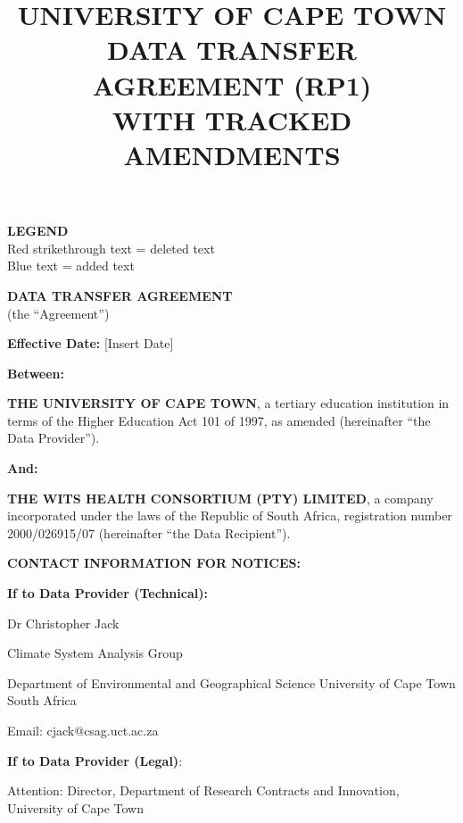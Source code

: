 \documentclass[12pt,letterpaper]{article}
\title{\textbf{UNIVERSITY OF CAPE TOWN\\DATA TRANSFER AGREEMENT (RP1)\\WITH TRACKED AMENDMENTS}}
\author{}
\date{}
\begin{document}
\maketitle

\begin{center}
\textbf{LEGEND}\\
\textcolor{deletecolor}{Red strikethrough text} = deleted text\\
\textcolor{addcolor}{Blue text} = added text
\end{center}

\vspace{1cm}

\begin{center}
\textbf{\Large DATA TRANSFER AGREEMENT}\\
\vspace{0.5cm}
(the ``Agreement'')
\end{center}

\vspace{0.5cm}

\textbf{Effective Date:} [Insert Date]

\textbf{Between:}

\textbf{THE UNIVERSITY OF CAPE TOWN}, a tertiary education institution in terms of the Higher Education Act 101 of 1997, as amended (hereinafter ``the Data Provider'').

\vspace{0.2cm}

\textbf{And:}

\textbf{THE WITS HEALTH CONSORTIUM (PTY) LIMITED}, a company incorporated under the laws of the Republic of South Africa, registration number 2000/026915/07 (hereinafter ``the Data Recipient'').

\vspace{0.5cm}

\textbf{CONTACT INFORMATION FOR NOTICES:}

\textbf{If to Data Provider (Technical):}

Dr Christopher Jack

Climate System Analysis Group

Department of Environmental and Geographical Science University of Cape Town South Africa

Email: cjack@csag.uct.ac.za

\textbf{If to Data Provider (Legal)}:

Attention: Director, Department of Research Contracts and Innovation, University of Cape Town
\end{document}
